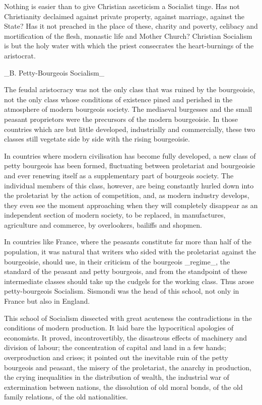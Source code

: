 Nothing is easier than to give Christian asceticism a Socialist tinge.
Has not Christianity declaimed against private property, against
marriage, against the State? Has it not preached in the place of these,
charity and poverty, celibacy and mortification of the flesh, monastic
life and Mother Church? Christian Socialism is but the holy water with
which the priest consecrates the heart-burnings of the aristocrat.

_B. Petty-Bourgeois Socialism_


The feudal aristocracy was not the only class that was ruined by the
bourgeoisie, not the only class whose conditions of existence pined and
perished in the atmosphere of modern bourgeois society. The mediaeval
burgesses and the small peasant proprietors were the precursors of the
modern bourgeoisie. In those countries which are but little developed,
industrially and commercially, these two classes still vegetate side by
side with the rising bourgeoisie.

In countries where modern civilisation has become fully developed, a
new class of petty bourgeois has been formed, fluctuating between
proletariat and bourgeoisie and ever renewing itself as a supplementary
part of bourgeois society. The individual members of this class,
however, are being constantly hurled down into the proletariat by the
action of competition, and, as modern industry develops, they even see
the moment approaching when they will completely disappear as an
independent section of modern society, to be replaced, in manufactures,
agriculture and commerce, by overlookers, bailiffs and shopmen.

In countries like France, where the peasants constitute far more than
half of the population, it was natural that writers who sided with the
proletariat against the bourgeoisie, should use, in their criticism of
the bourgeois _regime_, the standard of the peasant and petty
bourgeois, and from the standpoint of these intermediate classes should
take up the cudgels for the working class. Thus arose petty-bourgeois
Socialism. Sismondi was the head of this school, not only in France but
also in England.

This school of Socialism dissected with great acuteness the
contradictions in the conditions of modern production. It laid bare the
hypocritical apologies of economists. It proved, incontrovertibly, the
disastrous effects of machinery and division of labour; the
concentration of capital and land in a few hands; overproduction and
crises; it pointed out the inevitable ruin of the petty bourgeois and
peasant, the misery of the proletariat, the anarchy in production, the
crying inequalities in the distribution of wealth, the industrial war
of extermination between nations, the dissolution of old moral bonds,
of the old family relations, of the old nationalities.

